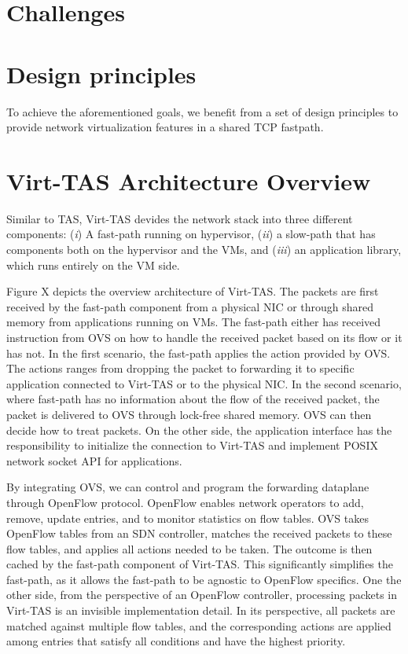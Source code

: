 \section{Challenges}

\section{Design principles}
To achieve the aforementioned goals, we benefit from a set of design principles 
to provide network virtualization features in a shared TCP fastpath.

\section{Virt-TAS Architecture Overview}

Similar to TAS, Virt-TAS devides the network stack into three different components:
(\emph{i}) A fast-path running on hypervisor, (\emph{ii}) a slow-path that has components
both on the hypervisor and the VMs, and (\emph{iii}) an application library, which 
runs entirely on the VM side. 

Figure X depicts the overview architecture of Virt-TAS. The packets are first received 
by the fast-path component from a physical NIC or through shared memory from applications 
running on VMs. The fast-path either has received instruction from OVS on how to handle 
the received packet based on its flow or it has not. In the first scenario, the fast-path 
applies the action provided by OVS. The actions ranges from dropping the packet to forwarding 
it to specific application connected to Virt-TAS or to the physical NIC. In the second 
scenario, where fast-path has no information about the flow of the received packet,  the 
packet is delivered to OVS through lock-free shared memory. OVS can then decide how to treat 
packets. On the other side, the application interface has the responsibility to initialize the 
connection to Virt-TAS and implement POSIX network socket API for applications.

By integrating OVS, we can control and program the forwarding dataplane through 
OpenFlow protocol. OpenFlow enables network operators to add, remove, update entries,
and to monitor statistics on flow tables. OVS takes OpenFlow tables from an SDN
controller, matches the received packets to these flow tables, and applies 
all actions needed to be taken. The outcome is then cached by the fast-path component
of Virt-TAS. This significantly simplifies the fast-path, as it allows the fast-path to 
be agnostic to OpenFlow specifics. One the other side, from the perspective of an OpenFlow 
controller,  processing packets in Virt-TAS is an invisible implementation detail. In its 
perspective, all packets are matched against multiple flow tables, and the corresponding 
actions are applied among entries that satisfy all conditions and have the highest priority.

